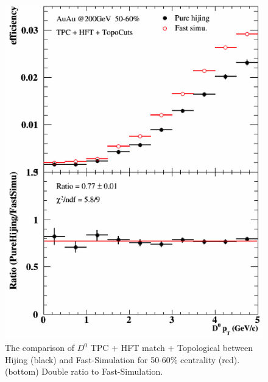 \documentclass[a4paper]{article}
\begin{document}
\begin{figure}[htbp]
\begin{minipage}[htbp]{0.47\linewidth}
\centering
\includegraphics[width=1.0\textwidth,angle=0]{fig/50_60.png}
\caption{ The comparison of $D^0$ TPC + HFT match + Topological between Hijing (black) and Fast-Simulation for 50-60\% centrality (red). (bottom) Double ratio to Fast-Simulation.\label{50_60}}
\end{minipage}
\hfill
\begin{minipage}[htbp]{0.47\linewidth}
\centering

\end{minipage}
\end{figure}
\end{document}
